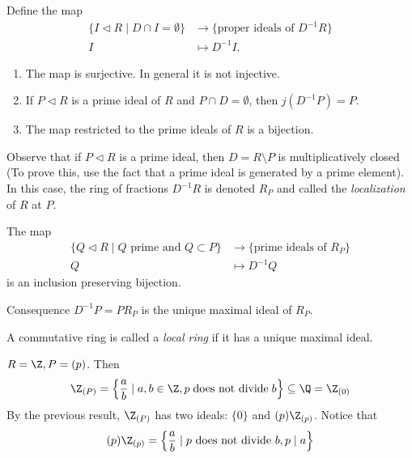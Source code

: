\documentclass[master.tex]{subfiles}
\begin{document}
  \begin{prop}
    Define the map
    \begin{align*}
      \{I \lhd R \mid D \cap I = \emptyset\} &\longrightarrow \{\text{proper ideals of } D^{-1}R\}\\
      I &\longmapsto D^{-1} I.
    \end{align*}
    \begin{enumerate}[label=(\alph*)]
    \item The map is surjective. In general it is not injective.
    \item If \(P \lhd R\) is a prime ideal of \(R\) and \(P \cap D = \emptyset\), then \(j(D^{-1}P)=P\).
    \item The map restricted to the prime ideals of \(R\) is a bijection.
    \end{enumerate}
  \end{prop}

  \begin{defn}
    Observe that if \(P \lhd R\) is a prime ideal, then \(D = R \setminus P\) is multiplicatively closed (To prove this, use the fact that a prime ideal is generated by a prime element).  In this case, the ring of fractions \(D^{-1}R\)
    is denoted \(R_P\) and called the \emph{localization} of \(R\) at \(P\).
  \end{defn}

  \begin{cor}
    The map
    \begin{align*}
      \{Q \lhd R \mid Q \text{ prime and } Q \subset P\} &\longrightarrow \{\text{prime ideals of } R_P \}\\
      Q& \longmapsto D^{-1}Q
    \end{align*}
    is an inclusion preserving bijection.
  \end{cor}
  Consequence \(D^{-1}P=PR_P\) is the unique maximal ideal of \(R_P\).

  \begin{defn*}
    A commutative ring is called a \emph{local ring} if it has a unique maximal ideal.
  \end{defn*}
  \begin{example}
    \(R=\Z, P=(p)\). Then
    \[\Z_{(P)}=\left\{\frac{a}{b} \mid a,b \in \Z, p \;\text{does not divide}\; b\right\} \subseteq \Q = \Z_{(0)}\]
    By the previous result, \(\Z_{(P)}\) has two ideals: \(\{0\}\) and \((p)\Z_{(p)}\). Notice that
    \[(p)\Z_{(p)}=\left\{\frac{a}{b} \mid p \text{ does not divide } b, p \mid a\right\}\]
  \end{example}
\end{document}

